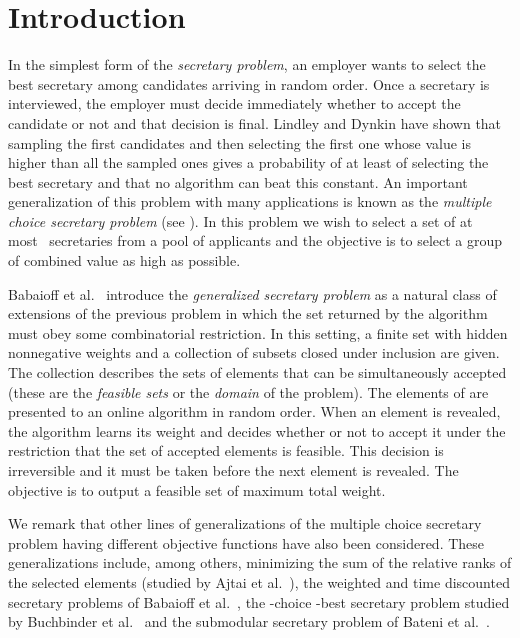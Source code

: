\documentclass[letterpaper,11pt]{article}
\theoremstyle{definition}
\theoremstyle{remark}
\begin{document}
\newpage
\setcounter{page}{1}
\section{Introduction}
In the simplest form of the \emph{secretary problem}, an employer wants to select the best secretary among  candidates arriving in random order. Once a secretary is interviewed, the employer must decide immediately whether to accept the candidate or not and that decision is final. Lindley \cite{lindley_dynamic_1961} and Dynkin \cite{dynkin_optimum_1963} have shown that sampling the first  candidates and then selecting the first one whose value is higher than all the sampled ones gives a probability of at least  of selecting the best secretary and that no algorithm can beat this constant. An important generalization of this problem with many applications is known as the \emph{multiple choice secretary problem} (see \cite{kleinberg_multiple-choice_2005}). In this problem we wish to select a set of at most~ secretaries from a pool of  applicants and the objective is to select a group of combined value as high as possible.

Babaioff et al.~\cite{babaioff_online_2008} introduce the \emph{generalized secretary problem} as a natural class of extensions of the previous problem in which the set returned by the algorithm must obey some combinatorial restriction. In this setting, a finite set  with hidden nonnegative weights and a collection of subsets  closed under inclusion are given. The collection  describes the sets of elements that can be simultaneously accepted (these are the \emph{feasible sets} or the \emph{domain} of the problem). The elements of  are presented to an online algorithm in random order. When an element is revealed, the algorithm learns its weight and decides whether or not to accept it under the restriction that the set of accepted elements is feasible. This decision is irreversible and it must be taken before the next element is revealed. The objective is to output a feasible set of maximum total weight.

We remark that other lines of generalizations of the multiple choice secretary problem having different objective functions have also been considered. These generalizations include, among others, minimizing the sum of the relative ranks of the selected elements (studied by Ajtai et al.~\cite{ajtai_1995}), the weighted and time discounted secretary problems of Babaioff et al.~\cite{babaioff_secretary_2009}, the -choice -best secretary problem studied by Buchbinder et al.~\cite{buchbinder2010secretary} and the submodular secretary problem of Bateni et al.~\cite{bateni-submodular2010}.
\end{document}
